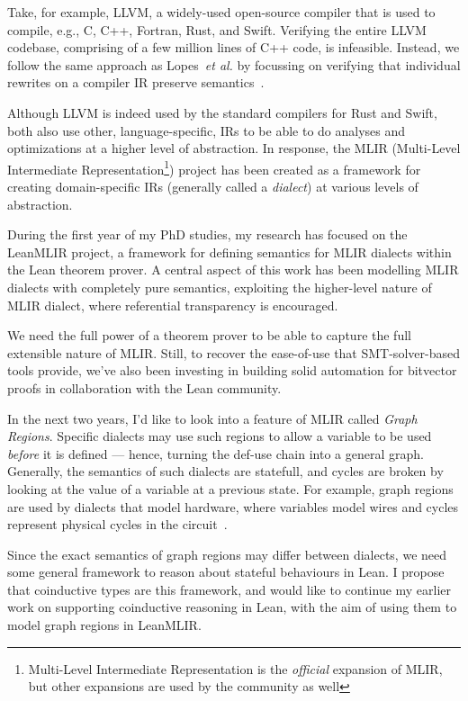 \documentclass[a4paper]{scrartcl}
\newcommand*{\etal}{~\emph{et al.}}
\begin{document}
Take, for example, LLVM, a widely-used open-source compiler that is used
to compile, e.g., C, C++, Fortran, Rust, and Swift. Verifying the entire
LLVM codebase, comprising of a few million lines of C++ code, is
infeasible. Instead, we follow the same approach as Lopes\etal{} by
focussing on verifying that individual rewrites on a compiler IR preserve
semantics~\cite{lopesAlive2BoundedTranslation2021}.

Although LLVM is indeed used by the standard compilers for Rust and
Swift, both also use other, language-specific, IRs to be able to do
analyses and optimizations at a higher level of abstraction. In
response, the MLIR (Multi-Level Intermediate Representation\footnote{Multi-Level
  Intermediate Representation is the \emph{official} expansion of MLIR,
  but other expansions are used by the community as well}) project has
been created as a framework for creating domain-specific IRs (generally
called a \emph{dialect}) at various levels of abstraction.

During the first year of my PhD studies, my research has focused on the
LeanMLIR project, a framework for defining semantics for MLIR dialects
within the Lean theorem prover. A central aspect of this work has been
modelling MLIR dialects with completely pure semantics, exploiting the
higher-level nature of MLIR dialect, where referential transparency is
encouraged.

We need the full power of a theorem prover to be able to capture the
full extensible nature of MLIR. Still, to recover the ease-of-use that
SMT-solver-based tools provide, we've also been investing in building
solid automation for bitvector proofs in collaboration with the Lean
community.

In the next two years, I'd like to look into a feature of MLIR called
\emph{Graph Regions}. Specific dialects may use such regions to allow a
variable to be used \emph{before} it is defined --- hence, turning the
def-use chain into a general graph. Generally, the semantics of such
dialects are statefull, and cycles are broken by looking at the value of
a variable at a previous state. For example, graph regions are used by
dialects that model hardware,
where variables model wires and cycles represent physical cycles in the
circuit~\cite{eldridgeMLIRHardwareCompiler}.

Since the exact semantics of graph regions may differ between dialects,
we need some general framework to reason about stateful behaviours in
Lean. I propose that coinductive types are this framework, and would
like to continue my earlier work on supporting coinductive reasoning in
Lean, with the aim of using them to model graph regions in LeanMLIR.
\end{document}
